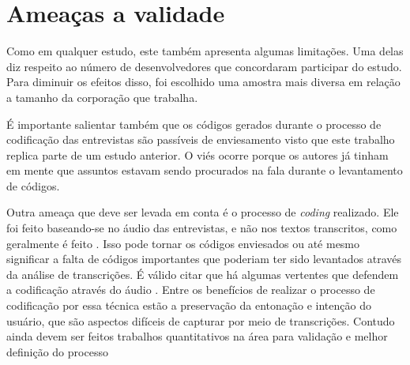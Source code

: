 \section{Ameaças a validade}

Como em qualquer estudo, este também apresenta algumas limitações. Uma delas diz respeito ao número de desenvolvedores que concordaram participar do estudo. Para diminuir os efeitos disso, foi escolhido uma amostra mais diversa em relação a tamanho da corporação que trabalha.

É importante salientar também que os códigos gerados durante o processo de codificação das entrevistas são passíveis de enviesamento visto que este trabalho replica parte de um estudo anterior. O viés ocorre porque os autores já tinham em mente que assuntos estavam sendo procurados na fala durante o levantamento de códigos. 

Outra ameaça que deve ser levada em conta é o processo de \emph{coding} realizado. Ele foi feito baseando-se no áudio das entrevistas, e não nos textos transcritos, como geralmente é feito \cite{groundedTheory}. Isso pode tornar os códigos enviesados ou até mesmo significar a falta de códigos importantes que poderiam ter sido levantados através da análise de transcrições. É válido citar que há algumas vertentes que defendem a codificação através do áudio \cite{listenCode}. Entre os benefícios de realizar o processo de codificação por essa técnica estão a preservação da entonação e intenção do usuário, que são aspectos difíceis de capturar por meio de transcrições. Contudo ainda devem ser feitos trabalhos quantitativos na área para validação e melhor definição do processo 
